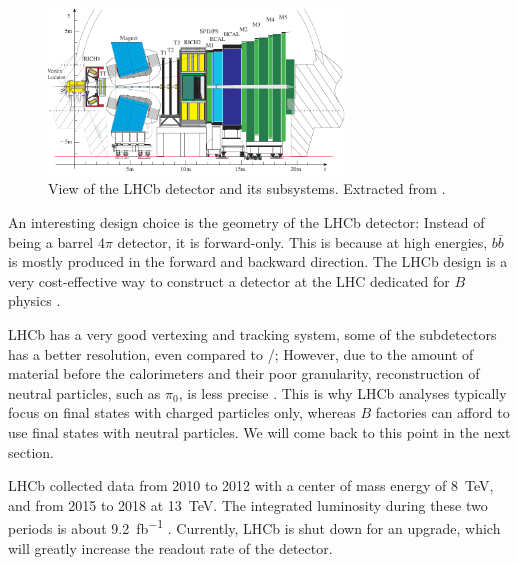 \begin{figure}[ht]
    \centering
    \includegraphics[width=0.7\textwidth]{figs/lhcb_detector_view.pdf}
    \caption{
        View of the LHCb detector and its subsystems.
        Extracted from \cite{LHCb:2003ab}.
    }
    \label{fig:lhcb_detector_view}
\end{figure}

An interesting design choice is the geometry of the LHCb detector:
Instead of being a barrel $4\pi$ detector, it is forward-only.
This is because at high energies, $b\bar{b}$ is mostly produced in the forward
and backward direction.
The LHCb design is a very cost-effective way to construct a detector at the LHC
dedicated for $B$ physics \cite{LHCb:2008}.

LHCb has a very good vertexing and tracking system, some of the subdetectors has
a better resolution, even compared to \BaBar/;
However, due to the amount of material before the calorimeters and their poor granularity,
reconstruction of neutral particles, such as $\pi_0$, is less 
precise \cite{LHCb:2008,Guz:2017}.
This is why LHCb analyses typically focus on final states with charged particles
only, whereas $B$ factories can afford to use final states with neutral particles.
We will come back to this point in the next section.

LHCb collected data from 2010 to 2012 with a center of mass energy of \SI{8}{TeV}, and from 2015 to 2018 at \SI{13}{TeV}.
The integrated luminosity during these two periods is about
\SI{9.2}{fb^{-1}} \cite{LHCb-Lumi:2019}.
Currently, LHCb is shut down for an upgrade, which will greatly increase the
readout rate of the detector.


